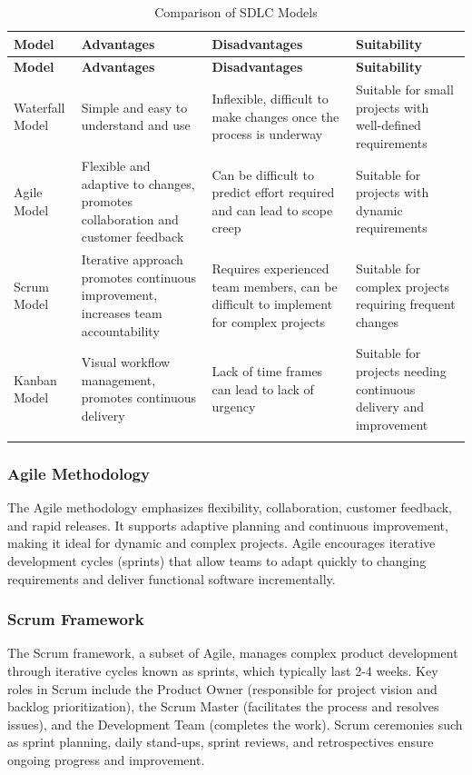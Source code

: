 \begin{longtable}{|m{3cm}|m{4cm}|m{4cm}|m{4cm}|}
\hline
\textbf{Model} & \textbf{Advantages} & \textbf{Disadvantages} & \textbf{Suitability} \\
\hline
\endfirsthead
\hline
\textbf{Model} & \textbf{Advantages} & \textbf{Disadvantages} & \textbf{Suitability} \\
\hline
\endhead
Waterfall Model & Simple and easy to understand and use & Inflexible, difficult to make changes once the process is underway & Suitable for small projects with well-defined requirements \\
\hline
Agile Model & Flexible and adaptive to changes, promotes collaboration and customer feedback & Can be difficult to predict effort required and can lead to scope creep & Suitable for projects with dynamic requirements \\
\hline
Scrum Model & Iterative approach promotes continuous improvement, increases team accountability & Requires experienced team members, can be difficult to implement for complex projects & Suitable for complex projects requiring frequent changes \\
\hline
Kanban Model & Visual workflow management, promotes continuous delivery & Lack of time frames can lead to lack of urgency & Suitable for projects needing continuous delivery and improvement \\
\hline
\caption{Comparison of SDLC Models}
\label{tab:sdlc_models}
\end{longtable}

\subsubsection{Agile Methodology}
The Agile methodology emphasizes flexibility, collaboration, customer feedback, and rapid releases. It supports adaptive planning and continuous improvement, making it ideal for dynamic and complex projects. Agile encourages iterative development cycles (sprints) that allow teams to adapt quickly to changing requirements and deliver functional software incrementally.

\subsubsection{Scrum Framework}
The Scrum framework, a subset of Agile, manages complex product development through iterative cycles known as sprints, which typically last 2-4 weeks. Key roles in Scrum include the Product Owner (responsible for project vision and backlog prioritization), the Scrum Master (facilitates the process and resolves issues), and the Development Team (completes the work). Scrum ceremonies such as sprint planning, daily stand-ups, sprint reviews, and retrospectives ensure ongoing progress and improvement.

